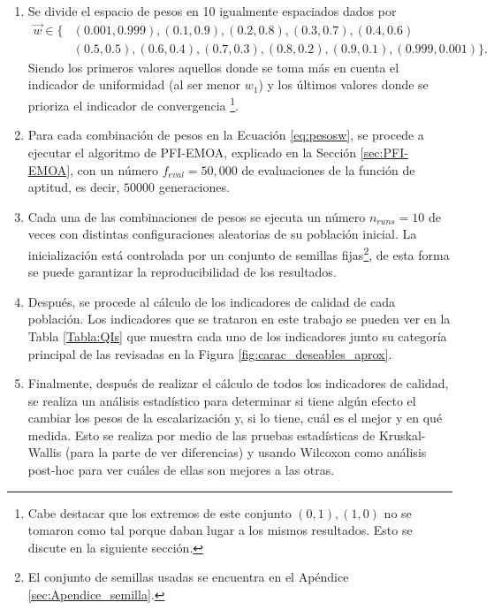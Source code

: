 \begin{enumerate}
    \item Se divide el espacio de pesos en 10 igualmente espaciados dados por 
    \begin{align} \label{eq:pesosw}
        \vec{w} \in \big\{ &(0.001,0.999),(0.1,0.9),(0.2,0.8),(0.3,0.7),(0.4,0.6) \nonumber\\
         &(0.5,0.5),(0.6,0.4),(0.7,0.3),(0.8,0.2),(0.9,0.1),(0.999,0.001) \big\}.
    \end{align}
    Siendo los primeros valores aquellos donde se toma más en cuenta el indicador de uniformidad (al ser menor $w_1$) y los últimos valores donde se prioriza el indicador de convergencia \footnote{Cabe destacar que los extremos de este conjunto $(0,1),(1,0)$ no se tomaron como tal porque daban lugar a los mismos resultados. Esto se discute en la siguiente sección.}.
    \item Para cada combinación de pesos en la Ecuación \ref{eq:pesosw}, se procede a ejecutar el algoritmo de PFI-EMOA, explicado en la Sección \ref{sec:PFI-EMOA}, con un número $f_{eval}=50,000$ de evaluaciones de la función de aptitud, es decir, $50000$  generaciones.
    \
    \item Cada una de las combinaciones de pesos se ejecuta un número $n_{runs}=10$ de veces con distintas configuraciones aleatorias de su población inicial. La inicialización está controlada por un conjunto de semillas fijas\footnote{El conjunto de semillas usadas se encuentra en el Apéndice \ref{sec:Apendice_semilla}.}, de esta forma se puede garantizar la reproducibilidad de los resultados.  

    \item Después, se procede al cálculo de los indicadores de calidad de cada población. Los indicadores que se trataron en este trabajo se pueden ver en la Tabla \ref{Tabla:QIs} que muestra cada uno de los indicadores junto su categoría principal de las revisadas en la Figura \ref{fig:carac_deseables_aprox}.
    \item Finalmente, después de realizar el cálculo de todos los indicadores de calidad, se realiza un análisis estadístico para determinar si tiene algún efecto el cambiar los pesos de la escalarización y, si lo tiene, cuál es el mejor y en qué medida. Esto se realiza por medio de las pruebas estadísticas de Kruskal-Wallis (para la parte de ver diferencias) y usando Wilcoxon como análisis post-hoc para ver cuáles de ellas son mejores a las otras.     
\end{enumerate}


